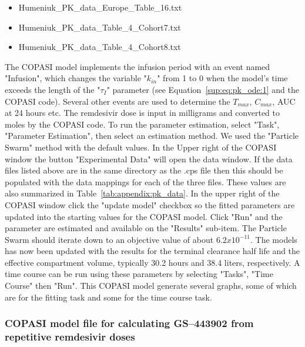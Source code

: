 \begin{itemize}
  \item {\selectfont Humeniuk\_PK\_data\_Europe\_Table\_16.txt}
  \item {\selectfont Humeniuk\_PK\_data\_Table\_4\_Cohort7.txt}
  \item  {\selectfont Humeniuk\_PK\_data\_Table\_4\_Cohort8.txt}
\end{itemize}

 \noindent The COPASI model implements the infusion period with an event named "Infusion", which changes the variable  "$k_{in}$" from 1 to 0 when the model's time exceeds the length of the "$\tau_I$" parameter (see Equation~\ref{sup:eq:pk_ode:1} and the COPASI code). Several other events are used to determine the $T_{max}$, $C_{max}$, AUC at 24 hours etc. The remdesivir dose is input in milligrams and converted to moles by the COPASI code.
 To run the parameter estimation, select "Task", "Parameter Estimation", then select an estimation method. We used the "Particle Swarm" method with the default values. In the Upper right of the COPASI window the button "Experimental Data" will open the data window. If the data files listed above are in the same directory as the .cps file then this should be populated with the data mappings for each of the three files. These values are also summarized in Table~\ref{tab:appendix:pk_data}. In the upper right of the COPASI window click the "update model" checkbox so the fitted parameters are updated into the starting values for the COPASI model. Click "Run" and the parameter are estimated and available on the  "Results" sub-item. The Particle Swarm should iterate down to an objective value of about $6.2x10^{-11}$. The models has now been updated with the results for the terminal clearance half life and the effective compartment volume, typically 30.2 hours and 38.4 liters, respectively. A time course can be run using these parameters by selecting "Tasks", "Time Course" then "Run". This COPASI model generate several graphs, some of which are for the fitting task and some for the time course task. 

\subsubsection{COPASI model file for calculating GS--443902 from repetitive remdesivir doses}

